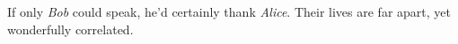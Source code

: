 \chapter*{}

\vspace{2em}

\begin{flushright}\small
  If only \emph{Bob} could speak, he'd certainly thank \emph{Alice}.
  Their lives
  are
  far apart, yet wonderfully correlated.
\end{flushright}
